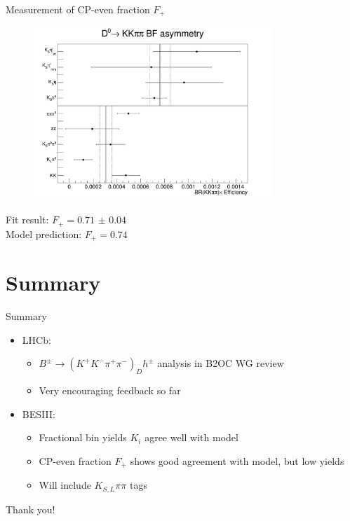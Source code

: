 \documentclass{beamer}
\begin{document}
\begin{frame}{Measurement of CP-even fraction $F_+$}
  \begin{figure}
    \includegraphics[width = 0.80\textwidth]{Plots/CPeven_fraction_combination.png}
  \end{figure}
  \vspace{-0.6cm}
  \begin{center}
    \large Fit result: $F_+ = \SI{0.71(4)}{}$ \\
    \large Model prediction: $F_+ = 0.74$
  \end{center}
\end{frame}

\section{Summary}

\begin{frame}{Summary}
  \begin{itemize}
    \setlength\itemsep{1.5em}
    \item{LHCb:}
    \begin{itemize}
      \setlength\itemsep{1.5em}
      \item{$B^\pm\to(K^+K^-\pi^+\pi^-)_Dh^\pm$ analysis in B2OC WG review}
      \item{Very encouraging feedback so far}
    \end{itemize}
    \item{BESIII:}
    \begin{itemize}
      \setlength\itemsep{1.5em}
      \item{Fractional bin yields $K_i$ agree well with model}
      \item{CP-even fraction $F_+$ shows good agreement with model, but low yields}
      \item{Will include $K_{S, L}\pi\pi$ tags}
    \end{itemize}
  \end{itemize}
  \begin{center}
    \huge Thank you!
  \end{center}
\end{frame}
\end{document}
